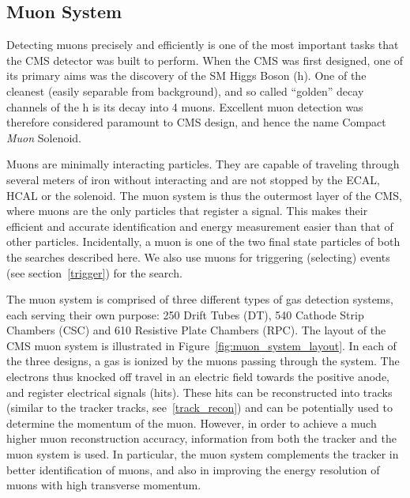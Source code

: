 \subsection{Muon System}
\label{muon_system}
Detecting muons precisely and efficiently is one of the most important tasks that the CMS detector was built to perform. When the CMS was first designed, one of its primary aims was the discovery of the SM Higgs Boson (h). One of the cleanest (easily separable from background), and so called ``golden'' decay channels of the h is its decay into 4 muons. Excellent muon detection was therefore considered paramount to CMS design, and hence the name Compact \textit{Muon} Solenoid.

Muons are minimally interacting particles. They are capable of traveling through several meters of iron without interacting and are not stopped by the ECAL, HCAL or the solenoid. The muon system is thus the outermost layer of the CMS, where muons are the only particles that register a signal. This makes their efficient and accurate identification and energy measurement easier than that of other particles. Incidentally, a muon is one of the two final state particles of both the searches described here. We also use muons for triggering (selecting) events (see section~\ref{trigger}) for the search.

The muon system is comprised of three different types of gas detection systems, each serving their own purpose: 250 Drift Tubes (DT), 540 Cathode Strip Chambers (CSC) and 610 Resistive Plate Chambers (RPC). The layout of the CMS muon system is illustrated in Figure~\ref{fig:muon_system_layout}. In each of the three designs, a gas is ionized by the muons passing through the system. The electrons thus knocked off travel in an electric field towards the positive anode, and register electrical signals (hits). These hits can be reconstructed into tracks (similar to the tracker tracks, see~\ref{track_recon}) and can be potentially used to determine the momentum of the muon. However, in order to achieve a much higher muon reconstruction accuracy, information from both the tracker and the muon system is used. In particular, the muon system complements the tracker in better identification of muons, and also in improving the energy resolution of muons with high transverse momentum.  


